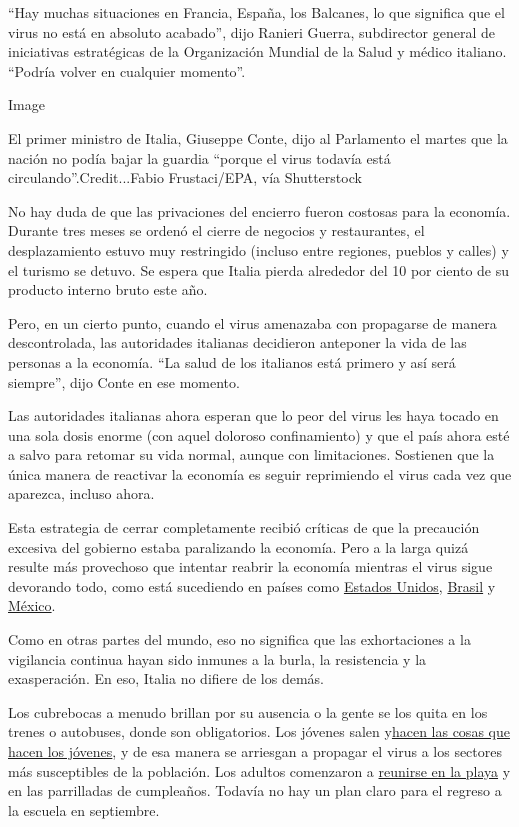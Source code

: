 ``Hay muchas situaciones en Francia, España, los Balcanes, lo que
significa que el virus no está en absoluto acabado'', dijo Ranieri
Guerra, subdirector general de iniciativas estratégicas de la
Organización Mundial de la Salud y médico italiano. ``Podría volver en
cualquier momento''.

Image

El primer ministro de Italia, Giuseppe Conte, dijo al Parlamento el
martes que la nación no podía bajar la guardia ``porque el virus todavía
está circulando''.Credit...Fabio Frustaci/EPA, vía Shutterstock

No hay duda de que las privaciones del encierro fueron costosas para la
economía. Durante tres meses se ordenó el cierre de negocios y
restaurantes, el desplazamiento estuvo muy restringido (incluso entre
regiones, pueblos y calles) y el turismo se detuvo. Se espera que Italia
pierda alrededor del 10 por ciento de su producto interno bruto este
año.

Pero, en un cierto punto, cuando el virus amenazaba con propagarse de
manera descontrolada, las autoridades italianas decidieron anteponer la
vida de las personas a la economía. ``La salud de los italianos está
primero y así será siempre'', dijo Conte en ese momento.

Las autoridades italianas ahora esperan que lo peor del virus les haya
tocado en una sola dosis enorme (con aquel doloroso confinamiento) y que
el país ahora esté a salvo para retomar su vida normal, aunque con
limitaciones. Sostienen que la única manera de reactivar la economía es
seguir reprimiendo el virus cada vez que aparezca, incluso ahora.

Esta estrategia de cerrar completamente recibió críticas de que la
precaución excesiva del gobierno estaba paralizando la economía. Pero a
la larga quizá resulte más provechoso que intentar reabrir la economía
mientras el virus sigue devorando todo, como está sucediendo en países
como
\href{https://www.nytimes.com/2020/03/13/us/coronavirus-deaths-estimate.html}{Estados
Unidos},
\href{https://www.nytimes.com/article/brazil-coronavirus-cases.html}{Brasil}
y
\href{https://www.nytimes.com/es/2020/06/05/espanol/america-latina/amlo-mexico-muertes-coronavirus.html}{México}.

Como en otras partes del mundo, eso no significa que las exhortaciones a
la vigilancia continua hayan sido inmunes a la burla, la resistencia y
la exasperación. En eso, Italia no difiere de los demás.

Los cubrebocas a menudo brillan por su ausencia o la gente se los quita
en los trenes o autobuses, donde son obligatorios. Los jóvenes salen
y\href{https://www.nytimes.com/2020/05/29/world/europe/italy-young-people-coronavirus.html}{hacen
las cosas que hacen los jóvenes}, y de esa manera se arriesgan a
propagar el virus a los sectores más susceptibles de la población. Los
adultos comenzaron a
\href{https://www.nytimes.com/2020/05/27/world/europe/italy-beaches-coronavirus-reopening.html}{reunirse
en la playa} y en las parrilladas de cumpleaños. Todavía no hay un plan
claro para el regreso a la escuela en septiembre.

